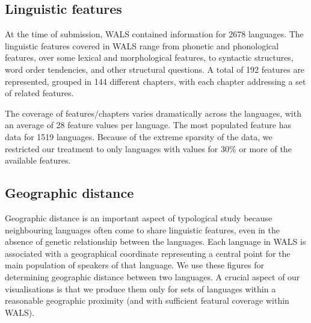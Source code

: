 \documentclass[11pt]{article}
\begin{document}



\subsection{Linguistic features}
At the time of submission, WALS contained information for 2678 languages. The linguistic features covered in WALS range from phonetic and phonological features, over some lexical and morphological features, to syntactic structures, word order tendencies, and other structural questions. A total of 192 features are represented, grouped in 144 different chapters, with each chapter addressing a set of related features. 

The coverage of features/chapters varies dramatically across the languages, with an average of 28 feature values per language. The most populated feature has data for 1519 languages. Because of the extreme sparsity of the data, we restricted our treatment to only languages with values for 30\% or more of the available features. 


\subsection{Geographic distance}
Geographic distance is an important aspect of typological study because neighbouring  languages often come to share linguistic features, even in the absence of genetic relationship between the languages. Each language in WALS is associated with a geographical coordinate representing a central point for the main population of speakers of that language. We use these figures for determining geographic distance between two languages. A crucial aspect of our visualisations is that we produce them only for sets of languages within a reasonable geographic proximity (and with sufficient featural coverage within WALS).
\end{document}

